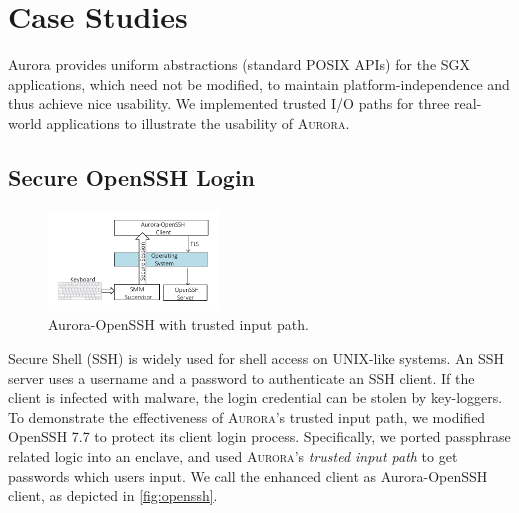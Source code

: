 %

\section{Case Studies}\label{casestudy}
Aurora provides uniform abstractions (standard POSIX APIs) for the SGX applications, which need not be modified, to maintain platform-independence and thus achieve nice usability. We implemented trusted I/O paths for three real-world applications to illustrate the usability of \textsc{Aurora}.

\subsection{Secure OpenSSH Login}\label{openssh}

\begin{figure}[t]
	\centering
	\includegraphics[width=0.4\textwidth]{figures/ssh.pdf} %
	\caption{Aurora-OpenSSH with trusted input path.}
	\label{fig:openssh}
\end{figure}

Secure Shell (SSH) is widely used for shell access on UNIX-like systems. An SSH server uses a username and a password to authenticate an SSH client. If the client is infected with malware, the login credential can be stolen by key-loggers. To demonstrate the effectiveness of \textsc{Aurora}'s trusted input path, we modified OpenSSH 7.7 to protect its client login process. Specifically, we ported passphrase related logic into an enclave, and used \textsc{Aurora}'s \textit{trusted input path} to get passwords which users input. We call the enhanced client as Aurora-OpenSSH client, as depicted in \autoref{fig:openssh}.

